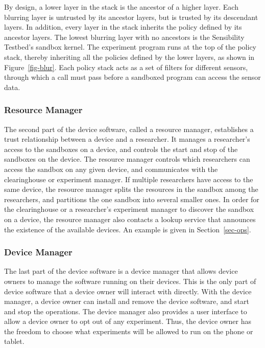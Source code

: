 By design, a lower layer in the stack is the ancestor of 
a higher layer. Each blurring layer is untrusted by its ancestor layers, 
but is trusted by its descendant layers. In addition, every layer in the stack inherits the policy 
defined by its ancestor layers. The lowest blurring layer with no ancestors is the 
Sensibility Testbed's sandbox kernel. The experiment program runs at the top 
of the policy stack, thereby inheriting all the policies defined by the
lower layers, as shown in Figure~\ref{fig-blur}. 
Each policy stack acts as a set of filters for different sensors, through 
which a call must pass before a sandboxed program can
access the sensor data. 



\subsubsection{Resource Manager} The second part of the device software, called a resource manager, 
establishes a trust relationship between a device and a researcher. It 
manages a researcher's access to the sandboxes on a device, and
controls the start and stop of the sandboxes on the device. The 
resource manager controls which researchers can access the 
sandbox on any given device, and communicates with the clearinghouse
or experiment manager. If multiple researchers have access to 
the same device, the resource manager splits the resources in the 
sandbox among the researchers, and partitions the one sandbox 
into several smaller ones. In order for the clearinghouse or a 
researcher's experiment manager to discover the sandbox on a 
device, the resource manager also contacts a lookup service that 
announces the existence of the available devices. An example is 
given in Section~\ref{sec-ops}.

\subsubsection{Device Manager} The last part of the device software is a device manager that 
allows device owners to manage the software running on their 
devices. This is the only part of device software that a device owner 
will interact with directly. With the device manager, a device owner  
can install and remove the device software, and start and stop the 
operations. The device manager also provides a user interface to 
allow a device owner to opt out of any experiment. Thus, the device 
owner has the freedom to choose what experiments will be allowed 
to run on the phone or tablet.


